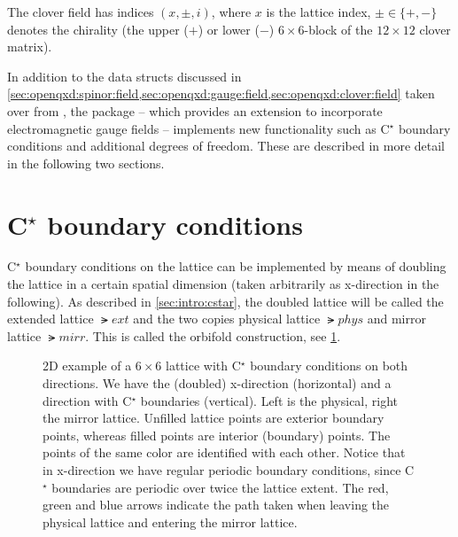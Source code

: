 The clover field has indices $(x, \pm, i)$, where $x$ is the lattice index, $\pm \in \{+, -\}$ denotes the chirality (\ie the upper ($+$) or lower ($-$) $6 \times 6$-block of the $12 \times 12$ clover matrix).



In addition to the data structs discussed in \cref{sec:openqxd:spinor:field,sec:openqxd:gauge:field,sec:openqxd:clover:field} taken over from \openqcd, the \openqxd package -- which provides an extension to incorporate electromagnetic gauge fields -- implements new functionality such as C$^\star$ boundary conditions and additional degrees of freedom.
These are described in more detail in the following two sections.

\section{C\texorpdfstring{$^{\star}$}{*} boundary conditions}
\label{sec:openqxd:cstar}

C$^{\star}$ boundary conditions on the lattice can be implemented by means of doubling the lattice in a certain spatial dimension (taken arbitrarily as x-direction in the following).
As described in \cref{sec:intro:cstar}, the doubled lattice will be called the extended lattice $\lat{ext}$ and the two copies physical lattice $\lat{phys}$ and mirror lattice $\lat{mirr}$.
This is called the orbifold construction, see \cref{fig:cstar:orbi}.
\begin{figure}
  
  \caption{2D example of a $6 \times 6$ lattice with C$^\star$ boundary conditions on both directions. We have the (doubled) x-direction (horizontal) and a direction with C$^\star$ boundaries (vertical). Left is the physical, right the mirror lattice. Unfilled lattice points are exterior boundary points, whereas filled points are interior (boundary) points. The points of the same color are identified with each other. Notice that in x-direction we have regular periodic boundary conditions, since C$^\star$ boundaries are periodic over twice the lattice extent. The red, green and blue arrows indicate the path taken when leaving the physical lattice and entering the mirror lattice.}
  \label{fig:cstar:orbi}
\end{figure}

